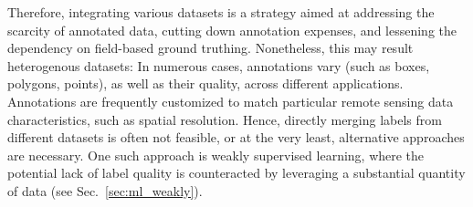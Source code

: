 \documentclass{CUP-JNL-DTM}%
\theoremstyle{definition}
\numberwithin{equation}{section}
\begin{document}
Therefore, integrating various datasets is a strategy aimed at addressing the scarcity of annotated data, cutting down annotation expenses, and lessening the dependency on field-based ground truthing.
Nonetheless, this may result heterogenous datasets: In numerous cases, annotations vary (such as boxes, polygons, points), as well as their quality, across different applications.
Annotations are frequently customized to match particular remote sensing data characteristics, such as spatial resolution.
Hence, directly merging labels from different datasets is often not feasible, or at the very least, alternative approaches are necessary. One such approach is weakly supervised learning, where the potential lack of label quality is counteracted by leveraging a substantial quantity of data (see Sec.~\ref{sec:ml_weakly}).
\end{document}
